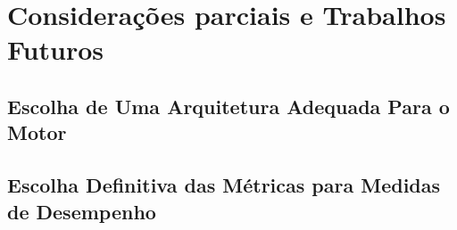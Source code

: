\chapter{Considera\c{c}\~oes parciais e Trabalhos Futuros}

\section{Escolha de Uma Arquitetura Adequada Para o Motor}

\section{Escolha Definitiva das Métricas para Medidas de Desempenho}
